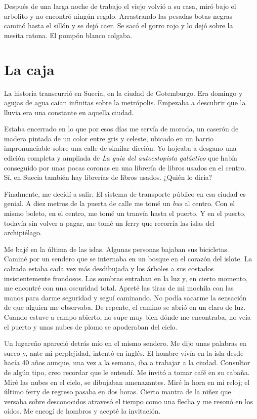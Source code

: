 \documentclass[11pt,twoside,openright,a6paper]{book}
\begin{document}
Después de una larga noche de trabajo el viejo volvió a su casa, miró bajo el arbolito y no encontró ningún regalo. Arrastrando las pesadas botas negras caminó hasta el sillón y se dejó caer. Se sacó el gorro rojo y lo dejó sobre la mesita ratona. El pompón blanco colgaba.

\chapter*{La caja}

La historia transcurrió en Suecia, en la ciudad de Gotemburgo. Era domingo y agujas de agua caían infinitas sobre la metrópolis. Empezaba a descubrir que la lluvia era una constante en aquella ciudad.

Estaba encerrado en lo que por esos días me servía de morada, un caserón de madera pintada de un color entre gris y celeste, ubicado en un barrio impronunciable sobre una calle de similar dicción. Yo hojeaba a desgano una edición completa y ampliada de \emph{La guía del autoestopista galáctico} que había conseguido por unas pocas coronas en una librería de libros usados en el centro. Sí, en Suecia también hay librerías de libros usados. ¿Quién lo diría?

Finalmente, me decidí a salir. El sistema de transporte público en esa ciudad es genial.  A diez metros de la puerta de calle me tomé un \emph{bus} al centro. Con el mismo boleto, en el centro, me tomé un tranvía hasta el puerto. Y en el puerto, todavía sin volver a pagar, me tomé un ferry que recorría las islas del archipiélago.

Me bajé en la última de las islas. Algunas personas bajaban sus bicicletas. Caminé por un sendero que se internaba en un bosque en el corazón del islote. La calzada estaba cada vez más desdibujada y los árboles a sus costados insistentemente frondosos. Las sombras entraban en la luz y, en cierto momento, me encontré con una oscuridad total. Apreté las tiras de mi mochila con las manos para darme seguridad y seguí caminando. No podía sacarme la sensación de que alguien me observaba. De repente, el camino se abrió en un claro de luz. Cuando estuve a campo abierto, no supe muy bien dónde me encontraba, no veía el puerto y unas nubes de plomo se apoderaban del cielo.

Un lugareño apareció detrás mío en el mismo sendero. Me dijo unas palabras en sueco y, ante mi perplejidad, intentó en inglés. El hombre vivía en la isla desde hacía 40 años aunque, una vez a la semana, iba a trabajar a la ciudad. Consultor de algún tipo, creo recordar que le entendí. Me invitó a tomar café en su cabaña. Miré las nubes en el cielo, se dibujaban amenazantes. Miré la hora en mi reloj; el último ferry de regreso pasaba en dos horas. Cierto mantra de la niñez que versaba sobre desconocidos atravesó el tiempo como una flecha y me resonó en los oídos. Me encogí de hombros y acepté la invitación.
\end{document}
